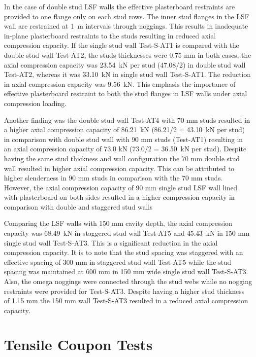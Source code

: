 In the case of double stud LSF walls the effective plasterboard restraints are provided to one flange only on each stud rows. The inner stud flanges in the LSF wall are restrained at 1~m intervals through noggings. This results in inadequate in-plane plasterboard restraints to the studs resulting in reduced axial compression capacity. If the single stud wall Test-S-AT1 is compared with the double stud wall Test-AT2, the studs thicknesses were 0.75 mm in both cases, the axial compression capacity was 23.54~kN per stud (47.08/2) in double stud wall Test-AT2, whereas it was 33.10~kN in single stud wall Test-S-AT1. The reduction in axial compression capacity was 9.56~kN. This emphasis the importance of effective plasterboard restraint to both the stud flanges in LSF walls under axial compression loading.

Another finding was the double stud wall Test-AT4 with 70 mm studs resulted in a higher axial compression capacity of 86.21~kN (86.21/2 = 43.10~kN per stud) in comparison with double stud wall with 90 mm studs (Test-AT1) resulting in an axial compression capacity of 73.0 kN (73.0/2 = 36.50~kN per stud). Despite having the same stud thickness and wall configuration the 70 mm double stud wall resulted in higher axial compression capacity. This can be attributed to higher slenderness in 90 mm studs in comparison with the 70 mm studs. However, the axial compression capacity of 90 mm single stud LSF wall lined with plasterboard on both sides resulted in a higher compression capacity in comparison with double and staggered stud walls 

Comparing the LSF walls with 150 mm cavity depth, the axial compression capacity was 68.49~kN in staggered stud wall Test-AT5 and 45.43~kN in 150 mm single stud wall Test-S-AT3. This is a significant reduction in the axial compression capacity. It is to note that the stud spacing was staggered with an effective spacing of 300 mm in staggered stud wall Test-AT5 while the stud spacing was maintained at 600 mm in 150 mm wide single stud wall Test-S-AT3. Also, the omega noggings were connected through the stud webs while no nogging restraints were provided for Test-S-AT3. Despite having a higher stud thickness of 1.15 mm the 150 mm wall Test-S-AT3 resulted in a reduced axial compression capacity. 

\section{Tensile Coupon Tests}

